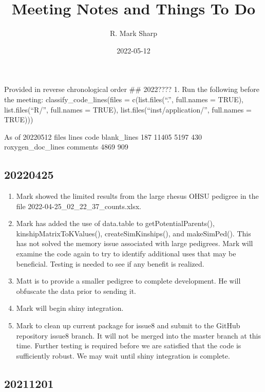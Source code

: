 \documentclass[
]{article}
\title{Meeting Notes and Things To Do}
\author{R. Mark Sharp}
\date{2022-05-12}
\providecommand{\tightlist}{%
  \setlength{\itemsep}{0pt}\setlength{\parskip}{0pt}}
\begin{document}
\maketitle

Provided in reverse chronological order \#\# 2022???? 1. Run the
following before the meeting: classify\_code\_lines(files =
c(list.files(``.'', full.names = TRUE), list.files(``R/'', full.names =
TRUE), list.files(``inst/application/'', full.names = TRUE)))

As of 20220512 files lines code blank\_lines 187 11405 5197 430
roxygen\_doc\_lines comments 4869 909

\hypertarget{section}{%
\subsection{20220425}\label{section}}

\begin{enumerate}
\def\labelenumi{\arabic{enumi}.}
\tightlist
\item
  Mark showed the limited results from the large rhesus OHSU pedigree in
  the file 2022-04-25\_02\_22\_37\_counts.xlsx.
\item
  Mark has added the use of data.table to getPotentialParents(),
  kinshipMatrixToKValues(), createSimKinships(), and makeSimPed(). This
  has not solved the memory issue associated with large pedigrees. Mark
  will examine the code again to try to identify additional uses that
  may be beneficial. Testing is needed to see if any benefit is
  realized.
\item
  Matt is to provide a smaller pedigree to complete development. He will
  obfuscate the data prior to sending it.
\item
  Mark will begin shiny integration.
\item
  Mark to clean up current package for issue8 and submit to the GitHub
  repository issue8 branch. It will not be merged into the master branch
  at this time. Further testing is required before we are satisfied that
  the code is sufficiently robust. We may wait until shiny integration
  is complete.
\end{enumerate}

\hypertarget{section-1}{%
\subsection{20211201}\label{section-1}}
\end{document}
